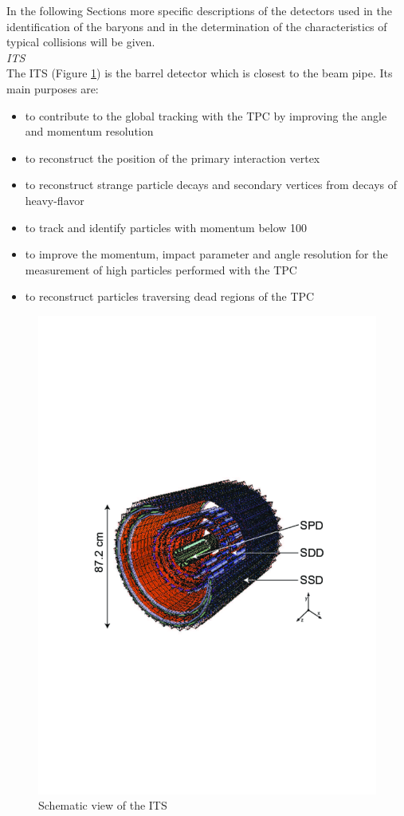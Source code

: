 In the following Sections more specific descriptions of the detectors used in the identification of the \xis baryons and in the determination of the characteristics of typical collisions will be given. \\

{\Large\textsl{ITS}}\\
The ITS \cite{cite:ALICE} (Figure \ref{fig:its}) is the barrel detector which is closest to the beam pipe. Its main purposes are:

\begin{itemize}
\item to contribute to the global tracking with the TPC by improving the angle and momentum resolution
\item to reconstruct the position of the primary interaction vertex
\item to reconstruct strange particle decays and secondary vertices from decays of heavy-flavor
\item to track and identify particles with momentum below 100 \mmass
\item to improve the momentum, impact parameter and angle resolution for the measurement of high \pt particles performed with the TPC
\item to reconstruct particles traversing dead regions of the TPC
\end{itemize}


\begin{figure}[htbp]
\begin{center}
\includegraphics[width=12.cm]{./Version1/FigChapter4/FigureITS}
\caption{Schematic view of the ITS \cite{cite:ITS}}
\label{fig:its}
\end{center}
\end{figure}



